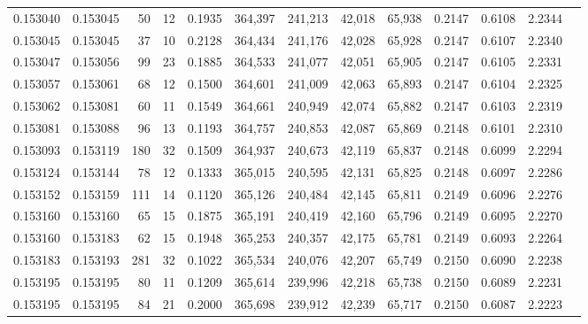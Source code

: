 \begin{tabular}{rrrrrrrrrrrrr}
0.153040 & 0.153045 &    50 &  12 &                                     0.1935 & 364,397 & 241,213 &  42,018 &  65,938 & 0.2147 & 0.6108 & 2.2344 \\
0.153045 & 0.153045 &    37 &  10 &                                     0.2128 & 364,434 & 241,176 &  42,028 &  65,928 & 0.2147 & 0.6107 & 2.2340 \\
0.153047 & 0.153056 &    99 &  23 &                                     0.1885 & 364,533 & 241,077 &  42,051 &  65,905 & 0.2147 & 0.6105 & 2.2331 \\
0.153057 & 0.153061 &    68 &  12 &                                     0.1500 & 364,601 & 241,009 &  42,063 &  65,893 & 0.2147 & 0.6104 & 2.2325 \\
0.153062 & 0.153081 &    60 &  11 &                                     0.1549 & 364,661 & 240,949 &  42,074 &  65,882 & 0.2147 & 0.6103 & 2.2319 \\
0.153081 & 0.153088 &    96 &  13 &                                     0.1193 & 364,757 & 240,853 &  42,087 &  65,869 & 0.2148 & 0.6101 & 2.2310 \\
0.153093 & 0.153119 &   180 &  32 &                                     0.1509 & 364,937 & 240,673 &  42,119 &  65,837 & 0.2148 & 0.6099 & 2.2294 \\
0.153124 & 0.153144 &    78 &  12 &                                     0.1333 & 365,015 & 240,595 &  42,131 &  65,825 & 0.2148 & 0.6097 & 2.2286 \\
0.153152 & 0.153159 &   111 &  14 &                                     0.1120 & 365,126 & 240,484 &  42,145 &  65,811 & 0.2149 & 0.6096 & 2.2276 \\
0.153160 & 0.153160 &    65 &  15 &                                     0.1875 & 365,191 & 240,419 &  42,160 &  65,796 & 0.2149 & 0.6095 & 2.2270 \\
0.153160 & 0.153183 &    62 &  15 &                                     0.1948 & 365,253 & 240,357 &  42,175 &  65,781 & 0.2149 & 0.6093 & 2.2264 \\
0.153183 & 0.153193 &   281 &  32 &                                     0.1022 & 365,534 & 240,076 &  42,207 &  65,749 & 0.2150 & 0.6090 & 2.2238 \\
0.153195 & 0.153195 &    80 &  11 &                                     0.1209 & 365,614 & 239,996 &  42,218 &  65,738 & 0.2150 & 0.6089 & 2.2231 \\
0.153195 & 0.153195 &    84 &  21 &                                     0.2000 & 365,698 & 239,912 &  42,239 &  65,717 & 0.2150 & 0.6087 & 2.2223 \\

\end{tabular}
